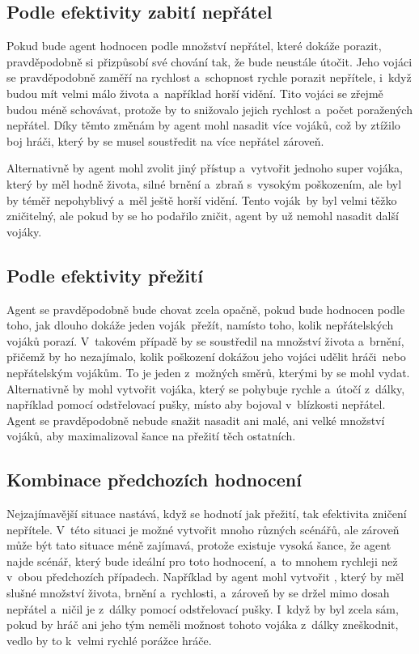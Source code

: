 \subsection{Podle efektivity zabití nepřátel}
Pokud bude agent hodnocen podle množství nepřátel, které dokáže porazit, pravděpodobně si přizpůsobí své chování tak, že bude neustále útočit. Jeho vojáci se pravděpodobně zaměří na rychlost a~schopnost rychle porazit nepřítele, i~když budou mít velmi málo života a~například horší vidění. Tito vojáci se zřejmě budou méně schovávat, protože by to snižovalo jejich rychlost a~počet poražených nepřátel. Díky těmto změnám by agent mohl nasadit více vojáků, což by ztížilo boj hráči, který by se musel soustředit na více nepřátel zároveň.

Alternativně by agent mohl zvolit jiný přístup a~vytvořit jednoho super vojáka, který by měl hodně života, silné brnění a~zbraň s~vysokým poškozením, ale byl by téměř nepohyblivý a~měl ještě horší vidění. Tento voják~by byl velmi těžko zničitelný, ale pokud by se ho podařilo zničit, agent by už nemohl nasadit další vojáky.

\subsection{Podle efektivity přežití}
Agent se pravděpodobně bude chovat zcela opačně, pokud bude hodnocen podle toho, jak dlouho dokáže jeden voják~přežít, namísto toho, kolik nepřátelských vojáků porazí. V~takovém případě by se soustředil na množství života a~brnění, přičemž by ho nezajímalo, kolik poškození dokážou jeho vojáci udělit hráči~nebo nepřátelským vojákům. To je jeden z~možných směrů, kterými by se mohl vydat. Alternativně by mohl vytvořit vojáka, který se pohybuje rychle a~útočí z~dálky, například pomocí odstřelovací pušky, místo aby bojoval v~blízkosti nepřátel. Agent se pravděpodobně nebude snažit nasadit ani malé, ani velké množství vojáků, aby maximalizoval šance na přežití těch ostatních.

\subsection{Kombinace předchozích hodnocení}
Nejzajímavější situace nastává, když se hodnotí jak přežití, tak efektivita zničení nepřítele. V~této situaci je možné vytvořit mnoho různých scénářů, ale zároveň může být tato situace méně zajímavá, protože existuje vysoká šance, že agent najde scénář, který bude ideální pro toto hodnocení, a~to mnohem rychleji než v~obou předchozích případech. Například by agent mohl vytvořit , který by měl slušné množství života, brnění a~rychlosti, a~zároveň by se držel mimo dosah nepřátel a~ničil je z~dálky pomocí odstřelovací pušky. I~když by byl zcela sám, pokud by hráč ani jeho tým neměli možnost tohoto vojáka z~dálky zneškodnit, vedlo by to k~velmi rychlé porážce hráče.
